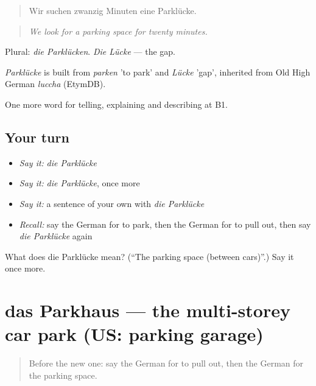 \begin{quote}
Wir suchen zwanzig Minuten eine Parklücke.
\end{quote}

\begin{quote}
\emph{We look for a parking space for twenty minutes.}
\end{quote}

Plural: \emph{die Parklücken}. \emph{Die Lücke} — the gap.

\begin{cousinweb}
\emph{Parklücke} is built from \emph{parken} 'to park' and \emph{Lücke} 'gap', inherited from Old High German \emph{luccha} (EtymDB).
\end{cousinweb}

\begin{grammarlens}[title={What you've built}]
One more word for telling, explaining and describing at B1.
\end{grammarlens}

\subsection*{Your turn}
\begin{itemize}
\raggedright
  \item \emph{Say it:} \emph{die Parklücke}
  \item \emph{Say it:} \emph{die Parklücke}, once more
  \item \emph{Say it:} a sentence of your own with \emph{die Parklücke}
  \item \emph{Recall:} say the German for to park, then the German for to pull out, then say \emph{die Parklücke} again
\end{itemize}

\begin{tcolorbox}[breakable,colback=teal!4,colframe=teal!35!black,title={Before you move on}]
What does die Parklücke mean? (\textquotedblleft{}The parking space (between cars)\textquotedblright{}.) Say it once more.
\end{tcolorbox}
\section[das Parkhaus]{das Parkhaus — the multi-storey car park (US: parking garage)}

\label{lesson:GE-C406-parkhaus}



\begin{quote}
Before the new one: say the German for to pull out, then the German for the parking space.
\end{quote}


